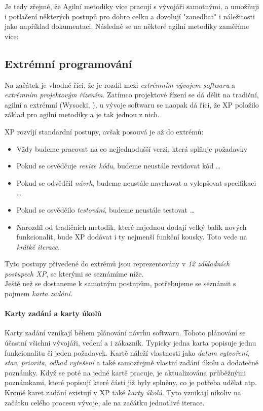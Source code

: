 Je tedy zřejmé, že Agilní metodiky více pracují s vývojáři samotnými, a umožňuji i potlačení některých postupů pro dobro celku a dovolují "zanedbat" i náležitosti jako například dokumentaci. Následně se na některé agilní metodiky zaměříme více:


\subsection{Extrémní programování} \label{methods:XP}

Na začátek je vhodné říci, že je rozdíl mezi \emph{extrémním vývojem softwaru} a \emph{extrémním projektovým řízením}. Zatímco projektové řízení se dá dělit na tradiční, agilní a extrémní (Wysocki, \cite{wysocki}), u vývoje softwaru se naopak dá říci, že XP položilo základ pro agilní metodiky a je tak jednou z nich.

XP rozvíjí standardní postupy, avšak posouvá je až do extrémů:
\begin{itemize}
	\item Vždy budeme pracovat na co nejjednodušší verzi, která splňuje požadavky
	\item Pokud se osvědčuje \emph{revize kódu}, budeme neustále revidovat kód \ldots
	\item Pokud se odvědčil \emph{návrh}, budeme neustále navrhovat a vylepšovat specifikaci \ldots
	\item Pokud se osvědčilo \emph{testování}, budeme neustále testovat \ldots
	\item Narozdíl od tradičních metodik, které najednou dodají velký balík nových funkcionalit, bude XP dodávat i ty nejmenší funkční kousky. Toto vede na \emph{krátké iterace}.
\end{itemize}

Tyto postupy přivedené do extrémů jsou reprezentovány v \emph{12 základních postupech XP}, se kterými se seznámíme níže.\\
Ještě než se dostaneme k samotným postupům, potřebujeme se seznámit s pojmem \emph{karta zadání.}

\paragraph{Karty zadání a karty úkolů} \label{methods:XP:issues}
Karty zadání vznikají během plánování návrhu softwaru. Tohoto plánování se účastní všichni vývojáři, vedení a i zákazník. Typicky jedna karta popisuje jednu funkcionalitu či jeden požadavek. Kartě náleží vlastnosti jako \emph{datum vytvoření}, \emph{stav}, \emph{priorita}, \emph{odhad vyřešení} a také samozřejmě vlastní zadání úkolu a dodatečné poznámky. Když se poté na jedné kartě pracuje, je aktualizována průběžnými poznámkami, které popisují které části již byly splněny, co je potřeba udělat atp.\\
Kromě karet zadání existují v XP také \emph{karty úkolů}. Tyto vznikají nikoliv na začátku celého procesu vývoje, ale na začátku jednotlivé iterace.

